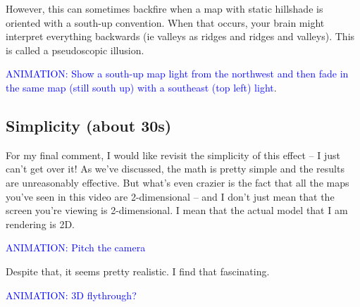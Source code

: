 \documentclass{article}
\newcommand\animation[1]{\textcolor{blue}{ANIMATION: #1}}
\begin{document}
However, this can sometimes backfire when a map with static hillshade is oriented with a south-up convention.
When that occurs, your brain might interpret everything backwards (ie valleys as ridges and ridges and valleys).
This is called a pseudoscopic illusion.

\animation{Show a south-up map light from the northwest and then fade in the same map (still south up) with a southeast (top left) light}.

\subsection{Simplicity (about 30s)}

For my final comment, I would like revisit the simplicity of this effect -- I just can't get over it!
As we've discussed, the math is pretty simple and the results are unreasonably effective.
But what's even crazier is the fact that all the maps you've seen in this video are 2-dimensional -- and I don't just mean that the screen you're viewing is 2-dimensional.
I mean that the actual model that I am rendering is 2D.

\animation{Pitch the camera}

Despite that, it seems pretty realistic.
I find that fascinating.

\animation{3D flythrough?}
\end{document}

